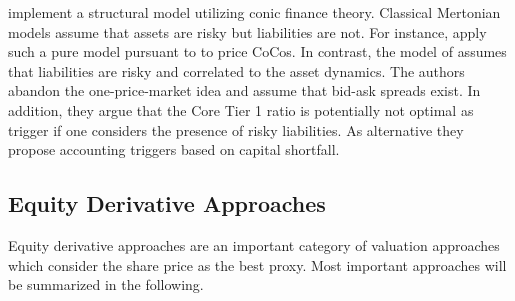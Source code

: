 \citet{madan2011conic} implement a structural model utilizing conic finance theory. Classical Mertonian models \citep{merton1974pricing} assume that assets are risky but liabilities are not. For instance, \citet{alvemar2012modelling} apply such a pure model pursuant to \citet{merton1974pricing} to price CoCos. In contrast, the model of \citet{madan2011conic} assumes that liabilities are risky and correlated to the asset dynamics. The authors abandon the one-price-market idea and assume that bid-ask spreads exist. In addition, they argue that the Core Tier 1 ratio is potentially not optimal as trigger if one considers the presence of risky liabilities. As alternative they propose accounting triggers based on capital shortfall.



\subsection*{Equity Derivative Approaches}
Equity derivative approaches are an important category of valuation approaches which consider the share price as the best proxy. Most important approaches will be summarized in the following.\\

